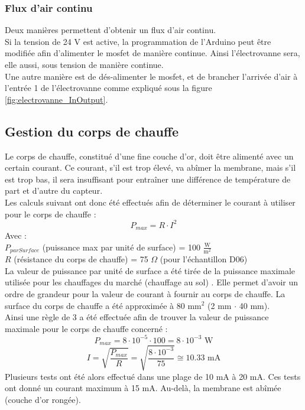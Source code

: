 \subsubsection{Flux d'air continu}
Deux manières permettent d'obtenir un flux d'air continu. \\

Si la tension de 24 V est active, la programmation de l'Arduino peut être modifiée afin d'alimenter le \gls{mosfet} de manière continue. 
Ainsi l'électrovanne sera, elle aussi, sous tension de manière continue. \\

Une autre manière est de dés-alimenter le \gls{mosfet}, et de brancher l'arrivée d'air à l'entrée 1 de l'électrovanne comme expliqué sous la 
figure \ref{fig:electrovanne_InOutput}. 

\subsection{Gestion du corps de chauffe}
\label{chap:corps_de_chauffe}
Le corps de chauffe, constitué d'une fine couche d'or, doit être alimenté avec un certain courant. Ce courant, s'il est trop élevé, va abîmer la
membrane, mais s'il est trop bas, il sera insuffisant pour entraîner une différence de température de part et d'autre du capteur. \\

Les calculs suivant ont donc été effectués afin de déterminer le courant à utiliser pour le corps de chauffe :
\[P_{max} = R\cdot I^2\]
Avec :\\
$P_{parSurface}$ (puissance max par unité de surface) = 100 $\frac{\text{W}}{\text{m}^2}$\\
$R$ (résistance du corps de chauffe) = 75 $\Omega$ (pour l'échantillon D06)\\

La valeur de puissance par unité de surface a été tirée de la puissance maximale utilisée pour les chauffages du marché (chauffage au sol) 
\cite{noauthor_choisir_nodate}.
Elle permet d'avoir un ordre de grandeur pour la valeur de courant à fournir au corps de chauffe.
La surface du corps de chauffe a été approximée à 80 mm$^2$ (2 mm $\cdot$ 40 mm).\\
Ainsi une règle de 3 a été effectuée afin de trouver la valeur de puissance maximale pour le corps de chauffe concerné :
\[P_{max} = 8\cdot 10^{-5}\cdot 100 = 8\cdot 10^{-3} \text{ W}\]
\[I = \sqrt{\frac{P_{max}}{R}} = \sqrt{\frac{8\cdot 10^{-3}}{75}} \cong 10.33\text{ mA}\]
Plusieurs tests ont été alors effectué dans une plage de 10 mA à 20 mA. Ces tests ont donné un courant maximum à 15 mA. Au-delà, la membrane
est abîmée (couche d'or rongée).\\

